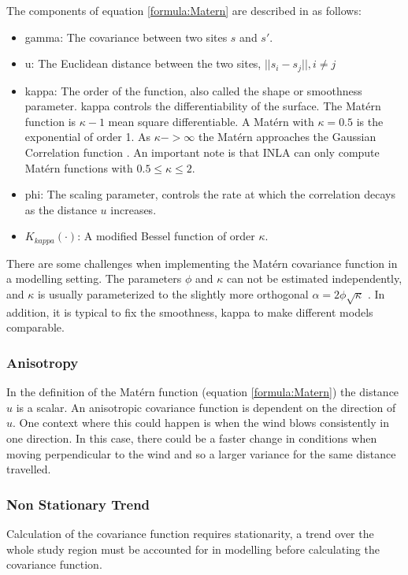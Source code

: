 The components of equation \ref{formula:Matern} are described in \cite{diggle:07} as follows:
\begin{itemize}
	\item \gls{gamma}:  The covariance between two sites $s$ and $s'$.
	\item \gls{u}: The Euclidean distance between the two sites,  $||s_i - s_j||, i \neq j$
	\item \gls{kappa}: The order of the function, also called the shape or smoothness parameter.  \gls{kappa} controls the differentiability of the surface.  The Mat\'{e}rn function is $\kappa -1$ mean square differentiable.  A Mat\'{e}rn with $\kappa = 0.5$ is the exponential of order 1.  As $\kappa -> \infty$  the Mat\'{e}rn approaches the Gaussian Correlation function  \cite{diggle:07}.  An important note is that INLA can only compute Mat\'{e}rn functions with $0.5 \leq \kappa \leq 2$.
	\item \gls{phi}: The scaling parameter, controls the rate at which the correlation decays as the distance $u$ increases.
	\item $K_{kappa}(\cdot)$: A modified Bessel function of order $\kappa$.
\end{itemize} 

There are some challenges when implementing the Mat\'{e}rn covariance function in a modelling setting.  The parameters $\phi$ and $\kappa$ can not be estimated independently, and $\kappa$ is usually parameterized to the slightly more orthogonal $\alpha = 2\phi \sqrt{\kappa}$  \citep{diggle:07}.  In addition, it is typical to fix the smoothness, \gls{kappa} to make different models comparable. 

\subsubsection*{Anisotropy}
\label{subsubsec:anisotropy}
In the definition of the Mat\'{e}rn function (equation \ref{formula:Matern}) the distance $u$ is a scalar.  An anisotropic covariance function is dependent on the direction of $u$.  One context where this could happen is when the wind blows consistently in one direction.  In this case, there could be a faster change in conditions when moving perpendicular to the wind and so a larger variance for the same distance travelled.  

\subsubsection*{Non Stationary Trend}\label{subsubsec:nonstatiomary}
Calculation of the covariance function requires stationarity, a trend over the whole study region must be accounted for in modelling before calculating the covariance function.

